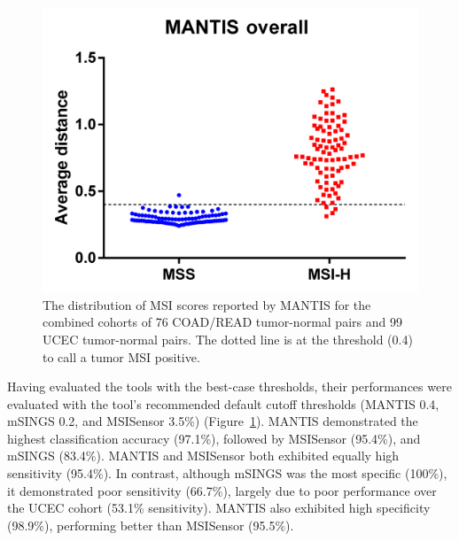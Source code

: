 \begin{figure}[htp]
	\centering
	\includegraphics[width=0.5\linewidth,keepaspectratio]{images/msilandscape/mantis_coad_read_ucec}
	\caption[Distribution of MANTIS scores for COAD/READ and UCEC combined tumor-normal pairs.]{The distribution of MSI scores reported by MANTIS for the combined cohorts of 76 COAD/READ tumor-normal pairs and 99 UCEC tumor-normal pairs. The dotted line is at the threshold (0.4) to call a tumor MSI positive.}
	\label{fig:msilandscape:mantis_coad_read_ucec}
\end{figure}
Having evaluated the tools with the best-case thresholds, their performances were evaluated with the tool's recommended default cutoff thresholds (MANTIS 0.4, mSINGS 0.2, and MSISensor 3.5\%) (Figure~\ref{fig:msilandscape:mantis_coad_read_ucec}). MANTIS demonstrated the highest classification accuracy (97.1\%), followed by MSISensor (95.4\%), and mSINGS (83.4\%). MANTIS and MSISensor both exhibited equally high sensitivity (95.4\%). In contrast, although mSINGS was the most specific (100\%), it demonstrated poor sensitivity (66.7\%), largely due to poor performance over the UCEC cohort (53.1\% sensitivity). MANTIS also exhibited high specificity (98.9\%), performing better than MSISensor (95.5\%).

